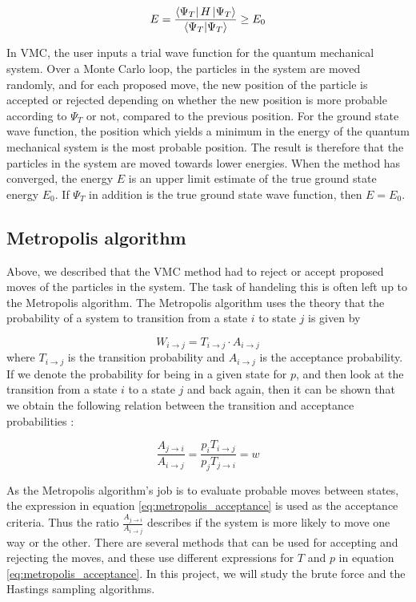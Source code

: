 \documentclass[norsk,a4paper,12pt]{article}
\begin{document}
\begin{equation}
	\label{eq:variational_method}
	E = \frac{\bra{\Psi_T}H \ket{\Psi_T}}{\braket{\Psi_T}} \geq E_0
\end{equation} 

In VMC, the user inputs a trial wave function for the quantum mechanical system. Over a Monte Carlo loop, the particles in the system are moved randomly, and for each proposed move, the new position of the particle is accepted or rejected depending on whether the new position is more probable according to $\Psi_T$ or not, compared to the previous position. For the ground state wave function, the position which yields a minimum in the energy of the quantum mechanical system is the most probable position. The result is therefore that the particles in the system are moved towards lower energies. When the method has converged, the energy $E$ is an upper limit estimate of the true ground state energy $E_0$. If $\Psi_T$ in addition is the true ground state wave function, then $E=E_0$. 

\subsection{Metropolis algorithm}
Above, we described that the VMC method had to reject or accept proposed moves of the particles in the system. The task of handeling this is often left up to the Metropolis algorithm. The Metropolis algorithm uses the theory that the probability of a system to transition from a state $i$ to state $j$ is given by

\begin{equation}
W_{i\rightarrow j} = T_{i \rightarrow j}\cdot A_{i \rightarrow j}
\end{equation}
where $T_{i \rightarrow j}$ is the transition probability and $A_{i \rightarrow j}$ is the acceptance probability. If we denote the probability for being in a given state for $p$, and then look at the transition from a state $i$ to a state $j$ and back again, then it can be shown that we obtain the following relation between the transition and acceptance probabilities \cite{Nordhagen}:

\begin{equation}
\label{eq:metropolis_acceptance}
\frac{A_{j\rightarrow i}}{A_{i\rightarrow j}}=\frac{p_iT_{i\rightarrow j}}{p_jT_{j\rightarrow i}} = w
\end{equation}

As the Metropolis algorithm's job is to evaluate probable moves between states, the expression in equation \ref{eq:metropolis_acceptance} is used as the acceptance criteria. Thus the ratio $\frac{A_{j\rightarrow i}}{A_{i\rightarrow j}}$ describes if the system is more likely to move one way or the other. There are several methods that can be used for accepting and rejecting the moves, and these use different expressions for $T$ and $p$ in equation \ref{eq:metropolis_acceptance}. In this project, we will study the brute force and the Hastings sampling algorithms.
\end{document}
